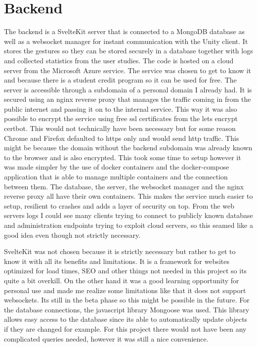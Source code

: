 




\section{Backend}

The backend is a SvelteKit server that is connected to a MongoDB database as well as a websocket manager for instant communication with the Unity client. It stores the gestures so they can be stored securely in a database together with logs and collected statistics from the user studies. The code is hosted on a cloud server from the Microsoft Azure service. The service was chosen to get to know it and because there is a student credit program so it can be used for free. The server is accessible through a subdomain of a personal domain I already had. It is secured using an nginx reverse proxy that manages the traffic coming in from the public internet and passing it on to the internal service. This way it was also possible to encrypt the service using free ssl certificates from the lets encrypt certbot. This would not technically have been necessary but for some reason Chrome and Firefox defaulted to https only and would send http traffic. This might be because the domain without the backend subdomain was already known to the browser and is also encrypted. This took some time to setup however it was made simpler by the use of docker containers and the docker-compose application that is able to manage multiple containers and the connection between them. The database, the server, the websocket manager and the nginx reverse proxy all have their own containers. This makes the service much easier to setup, resilient to crashes and adds a layer of security on top. From the web servers logs I could see many clients trying to connect to publicly known database and administration endpoints trying to exploit cloud servers, so this seamed like a good idea even though not strictly necessary. 

SvelteKit was not chosen because it is strictly necessary but rather to get to know it with all its benefits and limitations. It is a framework for websites optimized for load times, SEO and other things not needed in this project so its quite a bit overkill. On the other hand it was a good learning opportunity for personal use and made me realize some limitations like that it does not support websockets. Its still in the beta phase so this might be possible in the future. For the database connections, the javascript library Mongoose was used. This library allows easy access to the database since its able to automatically update objects if they are changed for example. For this project there would not have been any complicated queries needed, however it was still a nice convenience. 

